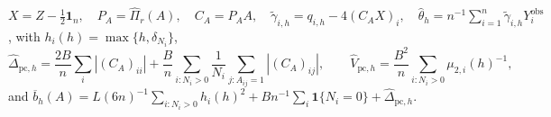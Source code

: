 \(X=Z-\tfrac12\mathbf1_n,\quad P_A=\widehat\Pi_r(A),\quad C_A=P_AA,\quad \widetilde\gamma_{i,h}=q_{i,h}-4(C_AX)_i,\quad \widehat\theta_h=n^{-1}\sum_{i=1}^n\widetilde\gamma_{i,h}Y_i^{\mathrm{obs}}\), with \(h_i(h)=\max\{h,\delta_{N_i}\}\),
\[
 \widehat\Delta_{\mathrm{pc},h}=\frac{2B}{n}\sum_i|(C_A)_{ii}|+\frac{B}{n}\sum_{i:N_i>0}\frac1{N_i}\sum_{j:A_{ij}=1}|(C_A)_{ij}|,
 \qquad
 \widehat V_{\mathrm{pc},h}=\frac{B^2}{n}\sum_{i:N_i>0}\mu_{2,i}(h)^{-1},
\]
and \(\overline b_h(A)=L(6n)^{-1}\sum_{i:N_i>0}h_i(h)^2+Bn^{-1}\sum_i\mathbf1\{N_i=0\}+\widehat\Delta_{\mathrm{pc},h}\).